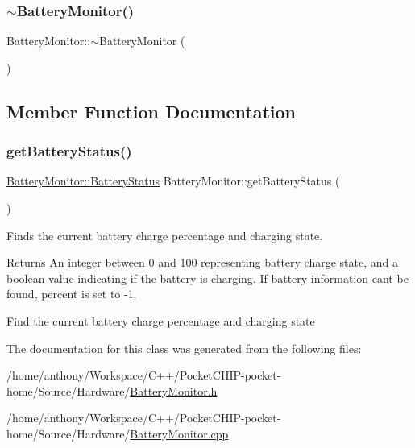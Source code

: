 \mbox{\label{classBatteryMonitor_ade860ba6ffe04195873a36dec4e287a7}} 
\subsubsection{\texorpdfstring{$\sim$\+Battery\+Monitor()}{~BatteryMonitor()}}
{\footnotesize\ttfamily Battery\+Monitor\+::$\sim$\+Battery\+Monitor (\begin{DoxyParamCaption}{ }\end{DoxyParamCaption})}



\subsection{Member Function Documentation}
\mbox{\label{classBatteryMonitor_aa1d9ec63974c47884c294f82637f152f}} 
\subsubsection{\texorpdfstring{get\+Battery\+Status()}{getBatteryStatus()}}
{\footnotesize\ttfamily \mbox{\hyperlink{structBatteryMonitor_1_1BatteryStatus}{Battery\+Monitor\+::\+Battery\+Status}} Battery\+Monitor\+::get\+Battery\+Status (\begin{DoxyParamCaption}{ }\end{DoxyParamCaption})}

Finds the current battery charge percentage and charging state.

\begin{DoxyReturn}{Returns}
An integer between 0 and 100 representing battery charge state, and a boolean value indicating if the battery is charging. If battery information can\textquotesingle{}t be found, percent is set to -\/1.
\end{DoxyReturn}
Find the current battery charge percentage and charging state 

The documentation for this class was generated from the following files\+:\begin{DoxyCompactItemize}
\item 
/home/anthony/\+Workspace/\+C++/\+Pocket\+C\+H\+I\+P-\/pocket-\/home/\+Source/\+Hardware/\mbox{\hyperlink{BatteryMonitor_8h}{Battery\+Monitor.\+h}}\item 
/home/anthony/\+Workspace/\+C++/\+Pocket\+C\+H\+I\+P-\/pocket-\/home/\+Source/\+Hardware/\mbox{\hyperlink{BatteryMonitor_8cpp}{Battery\+Monitor.\+cpp}}\end{DoxyCompactItemize}
